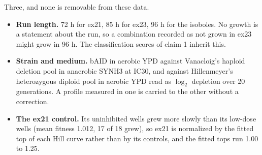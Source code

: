  Three, and none is removable from these
data.

\begin{itemize}[leftmargin=1.4em,itemsep=1pt]
\item \textbf{Run length.} 72 h for ex21, 85 h for ex23, 96 h for the isoboles. No
  growth is a statement about the run, so a combination recorded as not grown in ex23
  might grow in 96 h. The classification scores of claim 1 inherit this.
\item \textbf{Strain and medium.} bAID in aerobic YPD against Vanacloig's haploid
  deletion pool in anaerobic SYNH3 at IC30, and against Hillenmeyer's heterozygous
  diploid pool in aerobic YPD read as $\log_2$ depletion over 20 generations. A profile
  measured in one is carried to the other without a correction.
\item \textbf{The ex21 control.} Its uninhibited wells grew more slowly than its
  low-dose wells (mean fitness 1.012, 17 of 18 grew), so ex21 is normalized by the
  fitted top of each Hill curve rather than by its controls, and the fitted tops run
  1.00 to 1.25.
\end{itemize}

